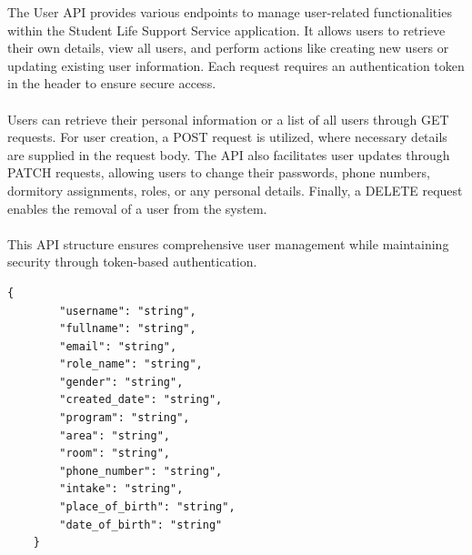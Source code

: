 The User API provides various endpoints to manage user-related functionalities within the Student Life Support Service application. It allows users to retrieve their own details, view all users, and perform actions like creating new users or updating existing user information. Each request requires an authentication token in the header to ensure secure access. \\ \\
Users can retrieve their personal information or a list of all users through GET requests. For user creation, a POST request is utilized, where necessary details are supplied in the request body. The API also facilitates user updates through PATCH requests, allowing users to change their passwords, phone numbers, dormitory assignments, roles, or any personal details. Finally, a DELETE request enables the removal of a user from the system. \\ \\
This API structure ensures comprehensive user management while maintaining security through token-based authentication.

\begin{lstlisting}[breaklines=true, caption=User Scheme]
	{
		"username": "string",
		"fullname": "string",
		"email": "string",
		"role_name": "string",
		"gender": "string",
		"created_date": "string",
		"program": "string",
		"area": "string",
		"room": "string",
		"phone_number": "string",
		"intake": "string",
		"place_of_birth": "string",
		"date_of_birth": "string"
	}
\end{lstlisting}



%


